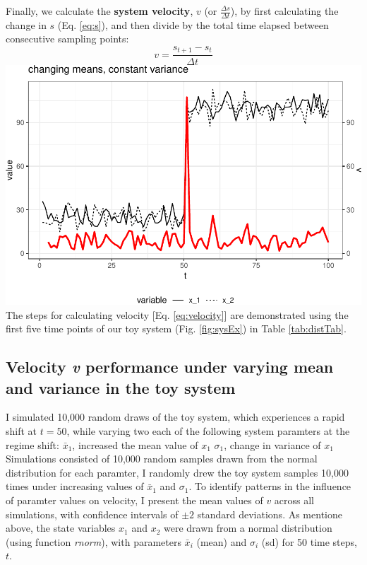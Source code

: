 \documentclass[12pt,twoside,openany]{reedthesis}
\begin{document}
Finally, we calculate the \textbf{system velocity}, \(v\) (or
\(\frac{\Delta s}{\Delta t}\)), by first calculating the change in \(s\)
(Eq. \eqref{eq:s}), and then divide by the total time elapsed between
consecutive sampling points:
\begin{equation}
 v = \frac {s_{t+1}-s_{t}}{\Delta t} 
\label{eq:velocity}
\end{equation}
\includegraphics{_myDissertation_files/figure-latex/velocSysEx1-1.pdf}
The steps for calculating velocity {[}Eq. \eqref{eq:velocity}{]} are
demonstrated using the first five time points of our toy system (Fig.
\ref{fig:sysEx}) in Table \ref{tab:distTab}.

\subsection{\texorpdfstring{Velocity \emph{v} performance under varying
mean and variance in the toy
system}{Velocity v performance under varying mean and variance in the toy system}}\label{velocity-v-performance-under-varying-mean-and-variance-in-the-toy-system}

I simulated 10,000 random draws of the toy system, which experiences a
rapid shift at \(t = 50\), while varying two each of the following
system paramters at the regime shift: \(\bar{x}_1\), increased the mean
value of \(x_1\) \(\sigma_1\), change in variance of \(x_1\) Simulations
consisted of 10,000 random samples drawn from the normal distribution
for each paramter, I randomly drew the toy system samples 10,000 times
under increasing values of \(\bar{x}_1\) and \(\sigma_1\). To identify
patterns in the influence of paramter values on velocity, I present the
mean values of \(v\) across all simulations, with confidence intervals
of \(\pm 2\) standard deviations. As mentione above, the state variables
\(x_1\) and \(x_2\) were drawn from a normal distribution (using
function \emph{rnorm}), with parameters \(\bar{x}_i\) (mean) and
\(\sigma_i\) (sd) for 50 time steps, \(t\).
\end{document}
